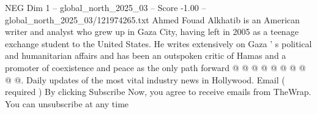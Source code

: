 \begin{textsample}{NEG Dim 1 – global\_north\_2025\_03 – Score -1.00 – global\_north\_2025\_03/121974265.txt}
Ahmed Fouad Alkhatib is an American writer and analyst who grew up in Gaza City, having left in 2005 as a teenage exchange student to the United States.
He writes extensively on Gaza ' s political and humanitarian affairs and has been an outspoken critic of Hamas and a promoter of coexistence and peace as the only path forward @ @ @ @ @ @ @ @ @ @.
Daily updates of the most vital industry news in Hollywood.
Email ( required ) By clicking Subscribe Now, you agree to receive emails from TheWrap.
You can unsubscribe at any time

\end{textsample}
